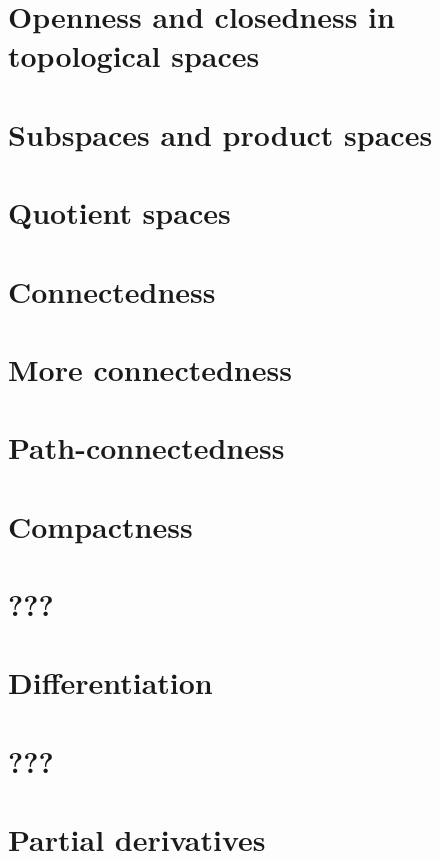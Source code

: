 \documentclass{article}
\begin{document}
\section{Openness and closedness in topological spaces}

\section{Subspaces and product spaces}

\section{Quotient spaces}

\section{Connectedness}

\section{More connectedness}

\section{Path-connectedness}

\section{Compactness}

\section{???}

\section{Differentiation}

\section{???}

\section{Partial derivatives}

\end{document}
